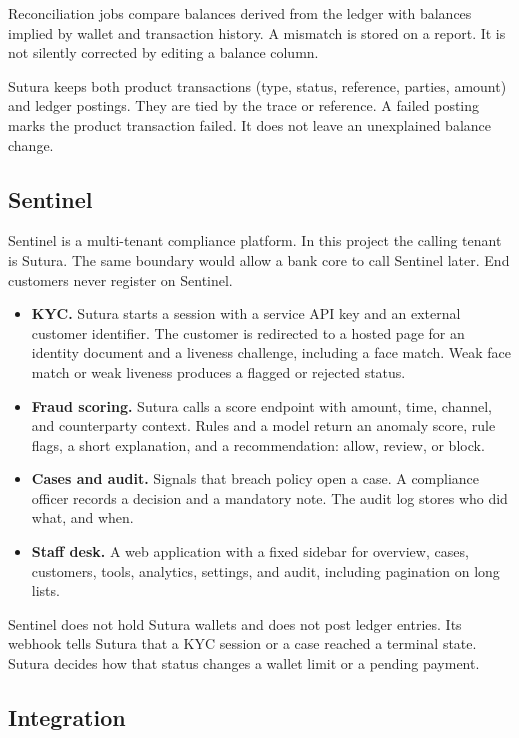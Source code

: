 \documentclass[12pt,a4paper]{article}
\begin{document}
Reconciliation jobs compare balances derived from the ledger with balances implied by wallet and transaction history. A mismatch is stored on a report. It is not silently corrected by editing a balance column.

Sutura keeps both product transactions (type, status, reference, parties, amount) and ledger postings. They are tied by the trace or reference. A failed posting marks the product transaction failed. It does not leave an unexplained balance change.

\subsection{Sentinel}

Sentinel is a multi-tenant compliance platform. In this project the calling tenant is Sutura. The same boundary would allow a bank core to call Sentinel later. End customers never register on Sentinel.

\begin{itemize}
  \item \textbf{KYC.} Sutura starts a session with a service API key and an external customer identifier. The customer is redirected to a hosted page for an identity document and a liveness challenge, including a face match. Weak face match or weak liveness produces a flagged or rejected status.
  \item \textbf{Fraud scoring.} Sutura calls a score endpoint with amount, time, channel, and counterparty context. Rules and a model return an anomaly score, rule flags, a short explanation, and a recommendation: allow, review, or block.
  \item \textbf{Cases and audit.} Signals that breach policy open a case. A compliance officer records a decision and a mandatory note. The audit log stores who did what, and when.
  \item \textbf{Staff desk.} A web application with a fixed sidebar for overview, cases, customers, tools, analytics, settings, and audit, including pagination on long lists.
\end{itemize}

Sentinel does not hold Sutura wallets and does not post ledger entries. Its webhook tells Sutura that a KYC session or a case reached a terminal state. Sutura decides how that status changes a wallet limit or a pending payment.

\subsection{Integration}
\end{document}
